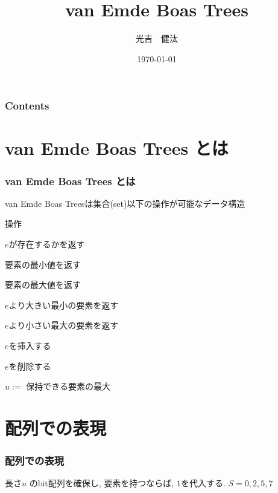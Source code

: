 \documentclass[dvipdfmx,12pt,notheorems]{beamer}
\title[略タイトル]{van Emde Boas Trees}
\author[Mitsuyoshi]{光吉　健汰}
\institute[IKN]{北海道大学工学部 情報エレクトロニクス学科 情報理工学コース 3年\\
	情報知識ネットワーク研究室}
\date{\today}%
\theoremstyle{definition}
\newcommand{\func}[1]{\ensuremath\mathrm{#1}}
\begin{document}
\begin{frame}[plain]\frametitle{}
\titlepage %
\end{frame}

\begin{frame}\frametitle{Contents}
\tableofcontents %
\end{frame}

\section{van Emde Boas Trees とは}
\begin{frame}\frametitle{van Emde Boas Trees とは}
	van Emde Boas Treesは集合(set)以下の操作が可能なデータ構造
\begin{block}{操作}
\begin{description}
\setlength{\labelwidth}{15ex}
\setlength{\itemindent}{8ex}
\item[$\func{member}(e)$]		$e$が存在するかを返す\\
\item[$\min()$]			要素の最小値を返す\\
\item[$\max()$]			要素の最大値を返す\\
\item[$\func{succesor}(e)$]	$e$より大きい最小の要素を返す\\
\item[$\func{predecessor}(e)$]	$e$より小さい最大の要素を返す\\
\item[$\func{insert}(e)$]		$e$を挿入する\\
\item[$\func{delete}(e)$]		$e$を削除する\\
\end{description}
\end{block}
\begin{block}{}
\end{block}
$u :=$ 保持できる要素の最大
\end{frame}

\section{配列での表現}
\begin{frame}\frametitle{配列での表現}
長さ$u$ のbit配列を確保し, 要素を持つならば, $1$を代入する. 
$S = { 0, 2, 5, 7}$
\end{frame}
\end{document}
